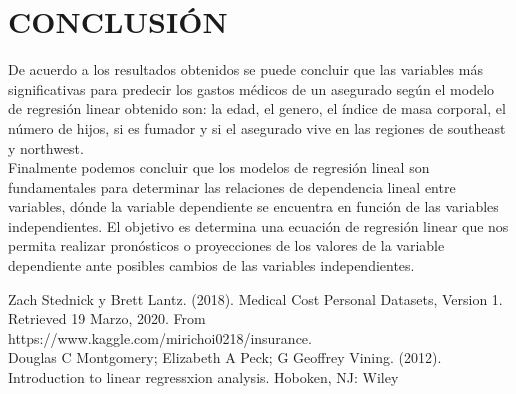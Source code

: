 \documentclass[letterpaper, 10 pt, conference]{ieeeconf}
\begin{document}
\newpage

\section{CONCLUSIÓN}

De acuerdo a los resultados obtenidos se puede concluir que las variables más significativas para predecir los gastos médicos de un asegurado según el modelo de regresión linear obtenido son: la edad,  el genero, el índice de masa corporal, el número de hijos, si es fumador y si el asegurado vive en las regiones de southeast y northwest.\\

Finalmente podemos concluir que los modelos de regresión lineal son fundamentales para determinar las relaciones de dependencia lineal entre variables, dónde la variable dependiente se encuentra en función de las variables independientes. El objetivo es determina una ecuación de regresión linear que nos permita realizar pronósticos o proyecciones de los valores de la variable dependiente ante posibles cambios de las variables independientes.\\

\begin{thebibliography}{}

 Zach Stednick y Brett Lantz. (2018). Medical Cost Personal Datasets, Version 1. Retrieved 19 Marzo, 2020. From https://www.kaggle.com/mirichoi0218/insurance.\\

\bibitem{} Douglas C Montgomery; Elizabeth A Peck; G Geoffrey Vining. (2012). Introduction to linear regressxion analysis. Hoboken, NJ: Wiley
\end{thebibliography}{}
\end{document}
